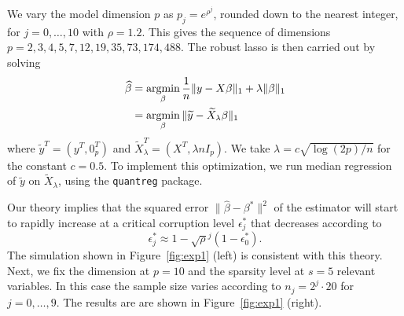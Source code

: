 We vary the model dimension $p$ as $p_{j} = e^{\rho^j}$, rounded down to the nearest integer, for $j=0,\ldots, 10$ with $\rho=1.2$. This gives the sequence of dimensions $p=2, 3, 4, 5, 7, 12, 19, 35, 73, 174, 488$. The robust lasso is then carried out
by solving
\begin{align*}
  \hat\beta &= \argmin_\beta \frac{1}{n}\|y - X\beta\|_1 + \lambda \|\beta\|_1\\
  &= \argmin_\beta \|\tilde y - \tilde X_\lambda \beta\|_1
\end{align*}
where $\tilde y^T = (y^T, 0_p^T)$  and $\tilde X_\lambda^T = (X^T, \lambda n I_p)$.
We take $\lambda  = c\sqrt{{\log (2p)}/{n}}$ for the constant $c=0.5$.
To implement this optimization, we run median regression of $\tilde y$ on $\tilde X_\lambda$, using the \texttt{quantreg} package.

Our theory implies that the squared error $\|\hat \beta - \beta^*\|^2$ of the estimator will start to rapidly increase at a critical corruption level $\epsilon^*_j$ that decreases according to
$$ \epsilon^*_{j} \approx 1- \sqrt{\rho}^j (1-\epsilon^*_0).$$
The simulation shown in Figure~\ref{fig:exp1} (left) is consistent with this theory.
Next, we fix the dimension at $p=10$ and the sparsity level at $s=5$ relevant variables. In this case
the sample size varies according to $n_j = 2^j \cdot 20$ for $j=0,\ldots, 9$. The results are
are shown in Figure~\ref{fig:exp1} (right).


